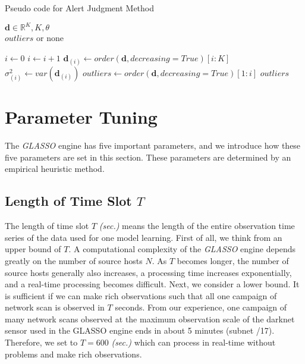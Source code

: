 \documentclass[conference]{IEEEtran}
\begin{document}
\begin{algorithm}[tb]
\caption{Pseudo code for Alert Judgment Method}
\label{alg2}
\begin{algorithmic}[1]
  \REQUIRE $\bm{d}\in\mathbb{R}^{K}, K, \theta$\\
  \ENSURE $outliers$ or none

  \STATE $i \gets 0$
    \STATE $i \gets i + 1$
    \STATE $\bm{d}_{(i)} \gets order(\bm{d}, decreasing=True)[i:K]$
    \STATE $\sigma_{(i)}^2 \gets var(\bm{d}_{(i)})$
      \STATE $outliers \gets order(\bm{d}, decreasing=True)[1:i]$
      \RETURN $outliers$
    \ENDIF
  \ENDWHILE
\end{algorithmic}
\end{algorithm}


\section{Parameter Tuning}
The {\it GLASSO} engine has five important parameters, and we introduce how these five parameters are set in this section.
These parameters are determined by an empirical heuristic method.


\subsection{Length of Time Slot $T$}
The length of time slot $T$ {\it (sec.)} means the length of the entire observation time series of the data used for one model learning.
First of all, we think from an upper bound of $T$.
A computational complexity of the {\it GLASSO} engine depends greatly on the number of source hosts $N$.
As $T$ becomes longer, the number of source hosts generally also increases, a processing time increases exponentially, and a real-time processing becomes difficult.
Next, we consider a lower bound.
It is sufficient if we can make rich observations such that all one campaign of network scan is observed in $T$ seconds.
From our experience, one campaign of many network scans observed at the maximum observation scale of the darknet sensor used in the GLASSO engine ends in about 5 minutes (subnet /17).
Therefore, we set to $T=600$ {\it (sec.)} which can process in real-time without problems and make rich observations.
\end{document}
